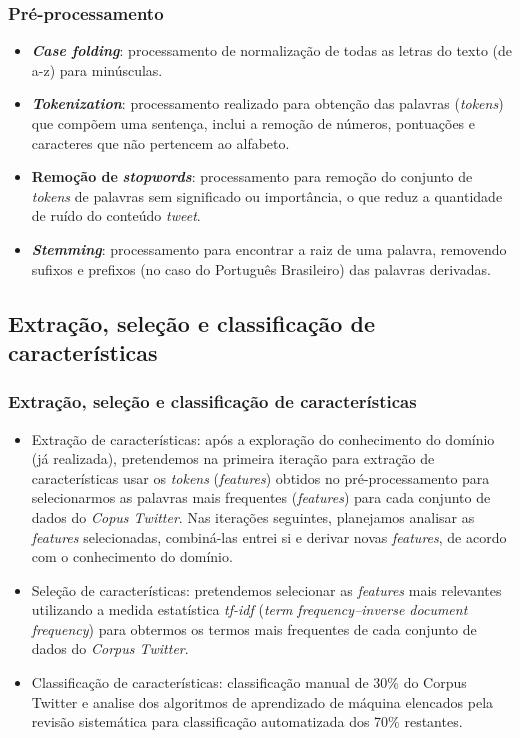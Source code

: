 \documentclass{beamer}
\begin{document}
\begin{frame}
\frametitle{Pré-processamento}
\begin{itemize}
\item \textit{\textbf{Case folding}}: processamento de normalização de todas as letras do texto (de a-z) para minúsculas.
\item \textit{\textbf{Tokenization}}: processamento realizado para obtenção das palavras  (\textit{tokens}) que compõem uma sentença, inclui a remoção de números, pontuações e caracteres que não pertencem ao alfabeto.  
\item \textbf{Remoção de} \textit{\textbf{stopwords}}: processamento para remoção do conjunto de \textit{tokens} de palavras sem significado ou importância, o que reduz a quantidade de ruído do conteúdo \textit{tweet}.
\item \textit{\textbf{Stemming}}: processamento para encontrar a raiz de uma palavra, removendo sufixos e prefixos (no caso do Português Brasileiro) das palavras derivadas.
\end{itemize}
\end{frame}
\subsection{Extração, seleção e classificação de características}
\begin{frame}
\frametitle{Extração, seleção e classificação de características}
\begin{itemize}
\item Extração de características: após a exploração do conhecimento do domínio (já realizada), pretendemos na primeira iteração para extração de características usar os \textit{tokens} (\textit{features}) obtidos no pré-processamento para selecionarmos as palavras mais frequentes (\textit{features}) para cada conjunto de dados do \textit{Copus Twitter}. Nas iterações seguintes, planejamos analisar as \textit{features} selecionadas, combiná-las entrei si e derivar novas \textit{features}, de acordo com o conhecimento do domínio.
\item Seleção de características: pretendemos selecionar as \textit{features} mais relevantes utilizando a medida estatística \textit{tf-idf} (\textit{term frequency–inverse document frequency}) para obtermos os termos mais frequentes de cada conjunto de dados do \textit{Corpus Twitter}.
\item Classificação de características: classificação manual de 30\% do Corpus Twitter e analise dos algoritmos de aprendizado de máquina elencados pela revisão sistemática para classificação automatizada dos 70\% restantes.
\end{itemize}
\end{frame}
\end{document}
